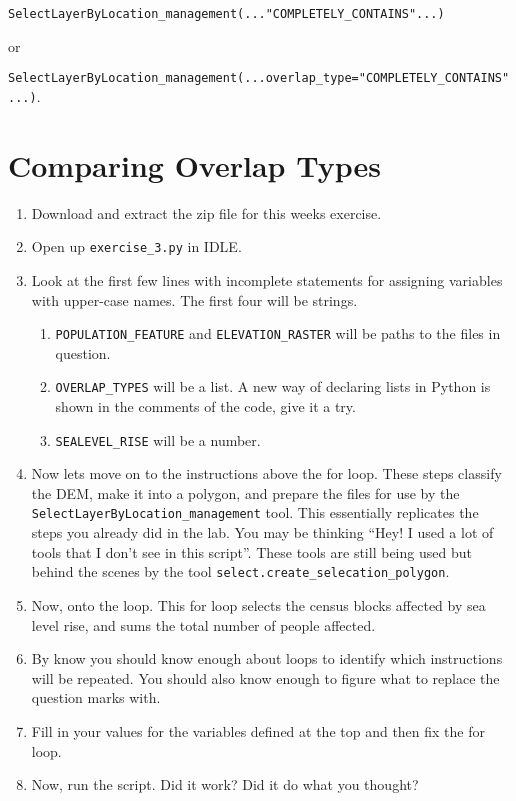 \documentclass{article}
\begin{document}
\noindent
\texttt{SelectLayerByLocation\_management(..."COMPLETELY\_CONTAINS"...)} 

or 

\noindent
\texttt{SelectLayerByLocation\_management(...overlap\_type="COMPLETELY\_CONTAINS"...)}.

\section{Comparing Overlap Types}
\begin{enumerate}
    \item Download and extract the zip file for this weeks exercise.
    \item Open up \texttt{exercise\_3.py} in IDLE.  
    \item Look at the first few lines with incomplete statements for assigning variables with upper-case names.  The first four will be strings. 
    \begin{enumerate}
        \item \texttt{POPULATION\_FEATURE} and \texttt{ELEVATION\_RASTER} will be paths to the files in question.  
        \item \texttt{OVERLAP\_TYPES} will be a list.  A new way of declaring lists in Python is shown in the comments of the code, give it a try.  
        \item \texttt{SEALEVEL\_RISE} will be a number.
    \end{enumerate}

    \item Now lets move on to the instructions above the for loop.  These steps classify the DEM, make it into a polygon, and prepare the files for use by the \texttt{SelectLayerByLocation\_management} tool.  This essentially replicates the steps you already did in the lab.  You may be thinking ``Hey!  I used a lot of tools that I don't see in this script''.  These tools are still being used but behind the scenes by the tool \texttt{select.create\_selecation\_polygon}.

    \item Now, onto the loop.  This for loop selects the census blocks affected by sea level rise, and sums the total number of people affected.  
    \item By know you should know enough about loops to identify which instructions will be repeated.  You should also know enough to figure what to replace the question marks with.  
    \item Fill in your values for the variables defined at the top and then fix the for loop.  
    \item Now, run the script.  Did it work?  Did it do what you thought?
\end{enumerate}
\end{document}
